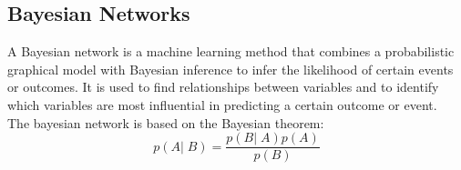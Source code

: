\subsection{Bayesian Networks}
A Bayesian network is a machine learning method that combines a probabilistic graphical model with Bayesian inference to infer the likelihood of certain events or outcomes. It is used to find relationships between variables and to identify which variables are most influential in predicting a certain outcome or event. \\
The bayesian network is based on the Bayesian theorem:
\begin{equation*}
    p(A|\;B) = \frac{p(B|\;A)p(A)}{p(B)}
\end{equation*}

